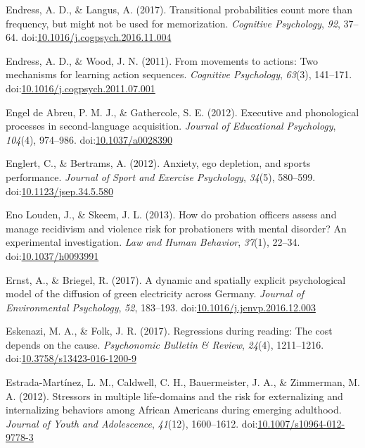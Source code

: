 \documentclass[english,man]{apa6}
\theoremstyle{definition}
\theoremstyle{definition}
\theoremstyle{definition}
\theoremstyle{remark}
\begin{document}
\hypertarget{ref-Endress2017}{}
Endress, A. D., \& Langus, A. (2017). Transitional probabilities count
more than frequency, but might not be used for memorization.
\emph{Cognitive Psychology}, \emph{92}, 37--64.
doi:\href{https://doi.org/10.1016/j.cogpsych.2016.11.004}{10.1016/j.cogpsych.2016.11.004}

\hypertarget{ref-Endress2011}{}
Endress, A. D., \& Wood, J. N. (2011). From movements to actions: Two
mechanisms for learning action sequences. \emph{Cognitive Psychology},
\emph{63}(3), 141--171.
doi:\href{https://doi.org/10.1016/j.cogpsych.2011.07.001}{10.1016/j.cogpsych.2011.07.001}

\hypertarget{ref-EngeldeAbreu2012}{}
Engel de Abreu, P. M. J., \& Gathercole, S. E. (2012). Executive and
phonological processes in second-language acquisition. \emph{Journal of
Educational Psychology}, \emph{104}(4), 974--986.
doi:\href{https://doi.org/10.1037/a0028390}{10.1037/a0028390}

\hypertarget{ref-Englert2012}{}
Englert, C., \& Bertrams, A. (2012). Anxiety, ego depletion, and sports
performance. \emph{Journal of Sport and Exercise Psychology},
\emph{34}(5), 580--599.
doi:\href{https://doi.org/10.1123/jsep.34.5.580}{10.1123/jsep.34.5.580}

\hypertarget{ref-EnoLouden2013}{}
Eno Louden, J., \& Skeem, J. L. (2013). How do probation officers assess
and manage recidivism and violence risk for probationers with mental
disorder? An experimental investigation. \emph{Law and Human Behavior},
\emph{37}(1), 22--34.
doi:\href{https://doi.org/10.1037/h0093991}{10.1037/h0093991}

\hypertarget{ref-Ernst2017}{}
Ernst, A., \& Briegel, R. (2017). A dynamic and spatially explicit
psychological model of the diffusion of green electricity across
Germany. \emph{Journal of Environmental Psychology}, \emph{52},
183--193.
doi:\href{https://doi.org/10.1016/j.jenvp.2016.12.003}{10.1016/j.jenvp.2016.12.003}

\hypertarget{ref-Eskenazi2016}{}
Eskenazi, M. A., \& Folk, J. R. (2017). Regressions during reading: The
cost depends on the cause. \emph{Psychonomic Bulletin \& Review},
\emph{24}(4), 1211--1216.
doi:\href{https://doi.org/10.3758/s13423-016-1200-9}{10.3758/s13423-016-1200-9}

\hypertarget{ref-Estrada-Martinez2012}{}
Estrada-Martínez, L. M., Caldwell, C. H., Bauermeister, J. A., \&
Zimmerman, M. A. (2012). Stressors in multiple life-domains and the risk
for externalizing and internalizing behaviors among African Americans
during emerging adulthood. \emph{Journal of Youth and Adolescence},
\emph{41}(12), 1600--1612.
doi:\href{https://doi.org/10.1007/s10964-012-9778-3}{10.1007/s10964-012-9778-3}
\end{document}
